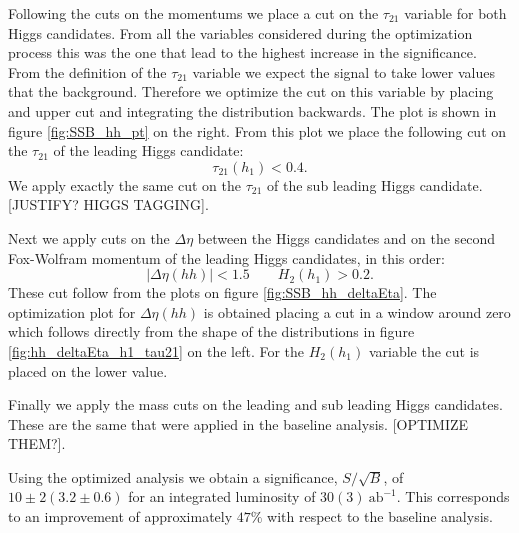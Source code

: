 Following the cuts on the momentums we place a cut on the $\tau_{21}$ variable for both Higgs candidates. From all the variables considered during the optimization process this was the one that lead to the highest increase in the significance. From the definition of the $\tau_{21}$ variable we expect the signal to take lower values that the background. Therefore we optimize the cut on this variable by placing and upper cut and integrating the distribution backwards. The plot is shown in figure \ref{fig:SSB_hh_pt} on the right. From this plot we place the following cut on the $\tau_{21}$ of the leading Higgs candidate:
\begin{equation}
	\tau_{21}(h_1)<0.4.
\end{equation}
We apply exactly the same cut on the $\tau_{21}$ of the sub leading Higgs candidate. [JUSTIFY? HIGGS TAGGING].

Next we apply cuts on the $\Delta\eta$ between the Higgs candidates and on the second Fox-Wolfram momentum of the leading Higgs candidates, in this order:
\begin{equation}
	|\Delta\eta(hh)|<1.5 \qquad H_2(h_1)>0.2.
\end{equation} 
These cut follow from the plots on figure \ref{fig:SSB_hh_deltaEta}. The optimization plot for $\Delta\eta(hh)$ is obtained placing a cut in a window around zero which follows directly from the shape of the distributions in figure \ref{fig:hh_deltaEta_h1_tau21} on the left. For the $H_2(h_1)$ variable the cut is placed on the lower value.

Finally we apply the mass cuts on the leading and sub leading Higgs candidates. These are the same that were applied in the baseline analysis. [OPTIMIZE THEM?].

Using the optimized analysis we obtain a significance, $S/\sqrt{B}$, of $10\pm2(3.2\pm0.6)$ for an integrated luminosity of $30(3)~\text{ab}^{-1}$. This corresponds to an improvement of approximately $47\%$ with respect to the baseline analysis.

